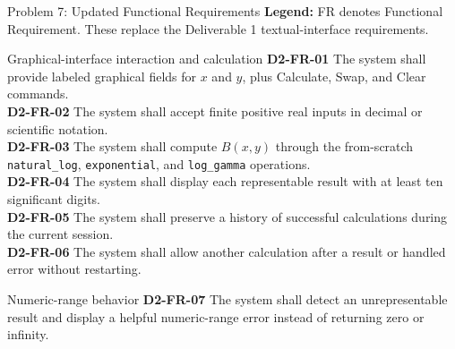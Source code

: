 \documentclass[aspectratio=169,10pt]{beamer}
\newcommand{\code}[1]{\texttt{#1}}
\begin{document}
\begin{frame}{Problem 7: Updated Functional Requirements}
  \scriptsize
  \textbf{Legend:} FR denotes Functional Requirement. These replace the
  Deliverable 1 textual-interface requirements.

  \vspace{0.35em}
  \begin{block}{Graphical-interface interaction and calculation}
    \footnotesize
    \textbf{D2-FR-01} The system shall provide labeled graphical fields for
    \(x\) and \(y\), plus Calculate, Swap, and Clear commands.\\[0.25em]
    \textbf{D2-FR-02} The system shall accept finite positive real inputs in
    decimal or scientific notation.\\[0.25em]
    \textbf{D2-FR-03} The system shall compute \(B(x,y)\) through the
    from-scratch \code{natural\_log}, \code{exponential}, and
    \code{log\_gamma} operations.\\[0.25em]
    \textbf{D2-FR-04} The system shall display each representable result with
    at least ten significant digits.\\[0.25em]
    \textbf{D2-FR-05} The system shall preserve a history of successful
    calculations during the current session.\\[0.25em]
    \textbf{D2-FR-06} The system shall allow another calculation after a result
    or handled error without restarting.
  \end{block}

  \begin{alertblock}{Numeric-range behavior}
    \scriptsize
    \textbf{D2-FR-07} The system shall detect an unrepresentable result and
    display a helpful numeric-range error instead of returning zero or infinity.
  \end{alertblock}
\end{frame}
\end{document}
